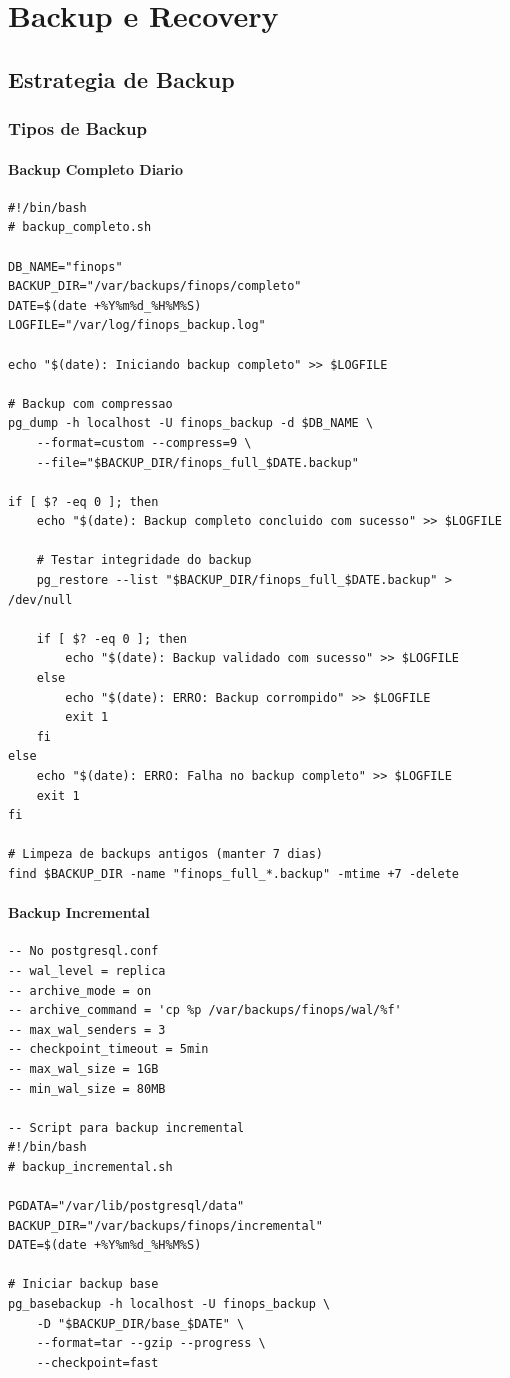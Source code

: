 \section{Backup e Recovery}

\subsection{Estrategia de Backup}

\subsubsection{Tipos de Backup}

\paragraph{Backup Completo Diario}
\begin{lstlisting}[caption=Script de backup completo]
#!/bin/bash
# backup_completo.sh

DB_NAME="finops"
BACKUP_DIR="/var/backups/finops/completo"
DATE=$(date +%Y%m%d_%H%M%S)
LOGFILE="/var/log/finops_backup.log"

echo "$(date): Iniciando backup completo" >> $LOGFILE

# Backup com compressao
pg_dump -h localhost -U finops_backup -d $DB_NAME \
    --format=custom --compress=9 \
    --file="$BACKUP_DIR/finops_full_$DATE.backup"

if [ $? -eq 0 ]; then
    echo "$(date): Backup completo concluido com sucesso" >> $LOGFILE
    
    # Testar integridade do backup
    pg_restore --list "$BACKUP_DIR/finops_full_$DATE.backup" > /dev/null
    
    if [ $? -eq 0 ]; then
        echo "$(date): Backup validado com sucesso" >> $LOGFILE
    else
        echo "$(date): ERRO: Backup corrompido" >> $LOGFILE
        exit 1
    fi
else
    echo "$(date): ERRO: Falha no backup completo" >> $LOGFILE
    exit 1
fi

# Limpeza de backups antigos (manter 7 dias)
find $BACKUP_DIR -name "finops_full_*.backup" -mtime +7 -delete
\end{lstlisting}

\paragraph{Backup Incremental}
\begin{lstlisting}[caption=Configuracao de WAL archiving]
-- No postgresql.conf
-- wal_level = replica
-- archive_mode = on
-- archive_command = 'cp %p /var/backups/finops/wal/%f'
-- max_wal_senders = 3
-- checkpoint_timeout = 5min
-- max_wal_size = 1GB
-- min_wal_size = 80MB

-- Script para backup incremental
#!/bin/bash
# backup_incremental.sh

PGDATA="/var/lib/postgresql/data"
BACKUP_DIR="/var/backups/finops/incremental"
DATE=$(date +%Y%m%d_%H%M%S)

# Iniciar backup base
pg_basebackup -h localhost -U finops_backup \
    -D "$BACKUP_DIR/base_$DATE" \
    --format=tar --gzip --progress \
    --checkpoint=fast
\end{lstlisting}

